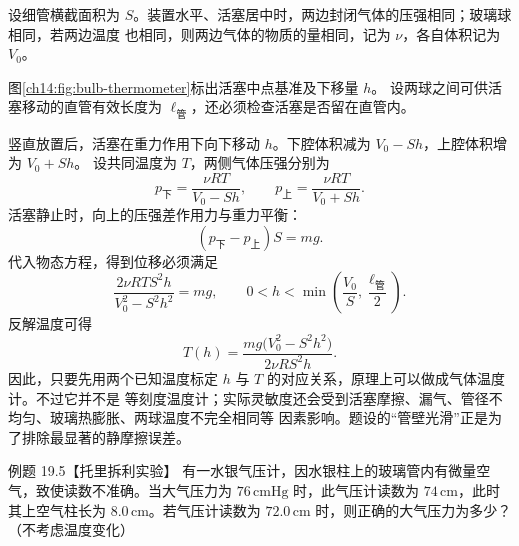 \begin{xesolution}
设细管横截面积为 $S$。装置水平、活塞居中时，两边封闭气体的压强相同；玻璃球相同，若两边温度
也相同，则两边气体的物质的量相同，记为 $\nu$，各自体积记为 $V_0$。

图\ref{ch14:fig:bulb-thermometer}标出活塞中点基准及下移量 $h$。
设两球之间可供活塞移动的直管有效长度为 $\ell_{\text{管}}$，还必须检查活塞是否留在直管内。
\bulbThermometerDiagram

竖直放置后，活塞在重力作用下向下移动 $h$。下腔体积减为 $V_0-Sh$，上腔体积增为 $V_0+Sh$。
设共同温度为 $T$，两侧气体压强分别为
\begin{equation}
  p_{\text{下}}=\frac{\nu RT}{V_0-Sh},\qquad
  p_{\text{上}}=\frac{\nu RT}{V_0+Sh}.
\end{equation}
活塞静止时，向上的压强差作用力与重力平衡：
\begin{equation}
  (p_{\text{下}}-p_{\text{上}})S=mg.
\end{equation}
代入物态方程，得到位移必须满足
\begin{equation}
  \boxed{\frac{2\nu RTS^2h}{V_0^2-S^2h^2}=mg},
  \qquad 0<h<\min\left(\frac{V_0}{S},\frac{\ell_{\text{管}}}2\right).
\end{equation}
反解温度可得
\begin{equation}
  \boxed{T(h)=\frac{mg\bigl(V_0^2-S^2h^2\bigr)}{2\nu RS^2h}}.
\end{equation}
因此，只要先用两个已知温度标定 $h$ 与 $T$ 的对应关系，原理上可以做成气体温度计。不过它并不是
等刻度温度计；实际灵敏度还会受到活塞摩擦、漏气、管径不均匀、玻璃热膨胀、两球温度不完全相同等
因素影响。题设的“管壁光滑”正是为了排除最显著的静摩擦误差。
\end{xesolution}

\begin{origexamplebox}{例题 19.5【托里拆利实验】}
有一水银气压计，因水银柱上的玻璃管内有微量空气，致使读数不准确。当大气压力为
$76\,\mathrm{cmHg}$ 时，此气压计读数为 $74\,\mathrm{cm}$，此时其上空气柱长为
$8.0\,\mathrm{cm}$。若气压计读数为 $72.0\,\mathrm{cm}$ 时，则正确的大气压力为多少？
（不考虑温度变化）
\end{origexamplebox}

